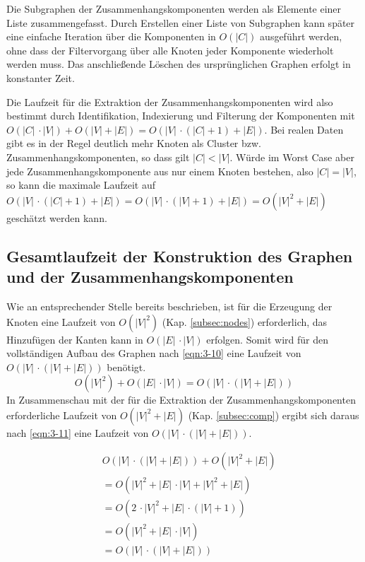 Die Subgraphen der Zusammenhangskomponenten werden als Elemente einer Liste zusammengefasst. Durch Erstellen einer Liste von Subgraphen kann später eine einfache Iteration über die Komponenten in $ O(|C|) $ ausgeführt werden, ohne dass der Filtervorgang über alle Knoten jeder Komponente wiederholt werden muss. 
Das anschließende Löschen des ursprünglichen Graphen erfolgt in konstanter Zeit.

Die Laufzeit für die Extraktion der Zusammenhangskomponenten wird also bestimmt durch Identifikation, Indexierung und Filterung der Komponenten mit $ O(|C| \, \cdotp |V|) + O(|V| + |E|) = O(|V| \, \cdotp (|C| + 1) +|E|)$. Bei realen Daten gibt es in der Regel deutlich mehr Knoten als Cluster bzw. Zusammenhangskomponenten, so dass gilt $ |C| < |V| $. Würde im Worst Case aber jede Zusammenhangskomponente aus nur einem Knoten bestehen, also $ |C| = |V| $, so kann die maximale Laufzeit auf $ O(|V| \, \cdotp (|C| + 1) +|E|) = O(|V| \, \cdotp (|V| + 1) + |E|) = O(|V|^2 + |E|) $ geschätzt werden kann.\\

\subsection{Gesamtlaufzeit der Konstruktion des Graphen und der Zusammenhangskomponenten} \label{subsec:graph_compl}
Wie an entsprechender Stelle bereits beschrieben, ist für die Erzeugung der Knoten eine Laufzeit von $ O(|V|^2) $ (Kap. \ref{subsec:nodes}) erforderlich, das Hinzufügen der Kanten kann in $ O(|E|\, \cdotp |V|) $ erfolgen. Somit wird für den vollständigen Aufbau des Graphen nach \eqref{eqn:3-10} eine Laufzeit von $ O(|V| \, \cdotp (|V|+|E|)) $ benötigt. \\
\begin{equation} \label{eqn:3-10}
\tag{3-10}
O(|V|^2) + O(|E|\, \cdotp |V|) = O(|V| \, \cdotp (|V|+|E|))
\end{equation}
In Zusammenschau mit der für die Extraktion der Zusammenhangskomponenten erforderliche Laufzeit von $ O(|V|^2 + |E|) $ (Kap. \ref{subsec:comp}) ergibt sich daraus nach  \eqref{eqn:3-11} eine Laufzeit von $ O(|V| \, \cdotp (|V| + |E|)) $. 

\begin{equation} \label{eqn:3-11}
\tag{3-11}
\begin{aligned}
&\ {} O(|V| \, \cdotp (|V|+|E|)) +O(|V|^2 + |E|) \\
& \ = O(|V|^2 + |E| \, \cdotp |V| + |V|^2 + |E|)\\
&\ = O(2 \, \cdotp |V|^2 + |E| \, \cdotp (|V| + 1)) \\
&\ = O(|V|^2 + |E| \, \cdotp |V|)\\
&\ = O(|V| \, \cdotp (|V| + |E|))\\
\end{aligned}
\end{equation}

